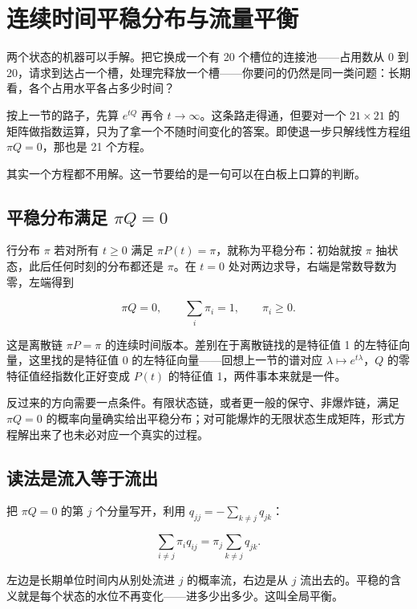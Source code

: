 \section{连续时间平稳分布与流量平衡}
\label{sec:06-Random-Processes/05-Continuous-Time-Markov-Chains-and-Queues/03}

两个状态的机器可以手解。把它换成一个有 20 个槽位的连接池——占用数从 0 到 20，请求到达占一个槽，处理完释放一个槽——你要问的仍然是同一类问题：长期看，各个占用水平各占多少时间？

按上一节的路子，先算 \(e^{tQ}\) 再令 \(t\to\infty\)。这条路走得通，但要对一个 \(21\times 21\) 的矩阵做指数运算，只为了拿一个不随时间变化的答案。即使退一步只解线性方程组 \(\pi Q=0\)，那也是 21 个方程。

其实一个方程都不用解。这一节要给的是一句可以在白板上口算的判断。

\subsection{平稳分布满足 \texorpdfstring{\(\pi Q=0\)}{piQ=0}}

行分布 \(\pi\) 若对所有 \(t\ge 0\) 满足 \(\pi P(t)=\pi\)，就称为平稳分布：初始就按 \(\pi\) 抽状态，此后任何时刻的分布都还是 \(\pi\)。在 \(t=0\) 处对两边求导，右端是常数导数为零，左端得到

\[
\pi Q=0,\qquad \sum_i\pi_i=1,\qquad \pi_i\ge 0.
\]

这是离散链 \(\pi P=\pi\) 的连续时间版本。差别在于离散链找的是特征值 1 的左特征向量，这里找的是特征值 0 的左特征向量——回想上一节的谱对应 \(\lambda\mapsto e^{t\lambda}\)，\(Q\) 的零特征值经指数化正好变成 \(P(t)\) 的特征值 1，两件事本来就是一件。

反过来的方向需要一点条件。有限状态链，或者更一般的保守、非爆炸链，满足 \(\pi Q=0\) 的概率向量确实给出平稳分布；对可能爆炸的无限状态生成矩阵，形式方程解出来了也未必对应一个真实的过程。

\subsection{读法是流入等于流出}

把 \(\pi Q=0\) 的第 \(j\) 个分量写开，利用 \(q_{jj}=-\sum_{k\ne j}q_{jk}\)：

\[
\sum_{i\ne j}\pi_i q_{ij}=\pi_j\sum_{k\ne j}q_{jk}.
\]

左边是长期单位时间内从别处流进 \(j\) 的概率流，右边是从 \(j\) 流出去的。平稳的含义就是每个状态的水位不再变化——进多少出多少。这叫全局平衡。

